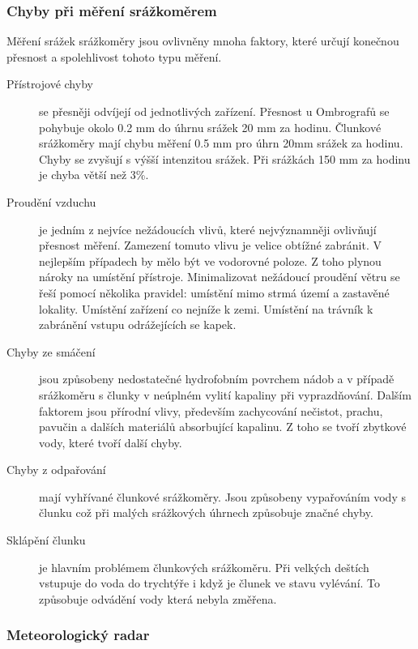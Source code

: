 \documentclass[a4paper,12pt]{article}
\begin{document}
\subsubsection*{Chyby při měření srážkoměrem} 
Měření srážek srážkoměry jsou ovlivněny mnoha faktory, které určují konečnou přesnost a spolehlivost tohoto typu měření.
\begin{description} 
\item[Přístrojové chyby] se přesněji odvíjejí od jednotlivých zařízení. Přesnost u Ombrografů se pohybuje okolo 0.2 mm do  úhrnu srážek 20 mm za hodinu. Člunkové srážkoměry mají chybu měření 0.5 mm pro úhrn 20mm  srážek za hodinu. Chyby se zvyšují s výšší intenzitou srážek. Při srážkách 150 mm za  hodinu je chyba větší než 3\%. \cite{wmo}
\item[Proudění vzduchu] je jedním z nejvíce nežádoucích vlivů, které nejvýznamněji ovlivňují přesnost měření. Zamezení tomuto vlivu je velice obtížné zabránit. V nejlepším případech by mělo být ve vodorovné poloze. Z toho plynou nároky na umístění přístroje. Minimalizovat nežádoucí proudění větru se řeší pomocí několika pravidel: umístění mimo strmá území a zastavěné lokality. Umístění zařízení co nejníže k zemi. Umístění na trávník k zabránění vstupu odrážejících se kapek. 
\item[Chyby ze smáčení] jsou způsobeny nedostatečné hydrofobním povrchem nádob a v případě srážkoměru s člunky v neúplném vylití kapaliny při vyprazdňování. Dalším faktorem jsou přírodní vlivy, především zachycování nečistot, prachu, pavučin a dalších materiálů absorbující kapalinu. Z toho se tvoří zbytkové vody, které tvoří další chyby. 
\item[Chyby z odpařování] mají vyhřívané člunkové srážkoměry. Jsou způsobeny vypařováním vody s člunku což při malých srážkových úhrnech způsobuje značné chyby.
\item[Sklápění člunku] je hlavním problémem člunkových srážkoměru. Při velkých deštích vstupuje do voda do trychtýře i když je člunek ve stavu vylévání. To způsobuje odvádění vody která nebyla změřena. 

\end{description}

\subsubsection{Meteorologický radar}
\end{document}
